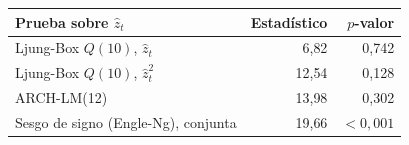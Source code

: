 \begin{tabular}{lrr}
\toprule
Prueba sobre $\hat z_t$ & Estadístico & $p$-valor \\
\midrule
Ljung-Box $Q(10)$, $\hat z_t$ & 6{,}82 & 0{,}742 \\
Ljung-Box $Q(10)$, $\hat z_t^2$ & 12{,}54 & 0{,}128 \\
ARCH-LM(12) & 13{,}98 & 0{,}302 \\
Sesgo de signo (Engle-Ng), conjunta & 19{,}66 & $<0{,}001$ \\
\bottomrule
\end{tabular}

